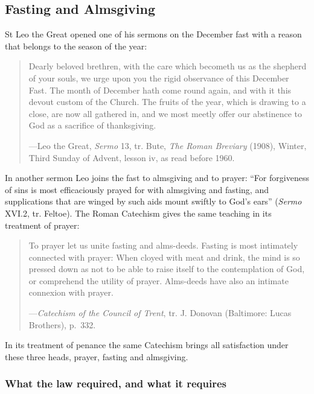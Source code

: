\subsection{Fasting and Almsgiving}\label{sec:fasting}

St Leo the Great opened one of his sermons on the December fast with a reason that belongs to the
season of the year:

\begin{quote}
Dearly beloved brethren, with the care which becometh us as the shepherd of your souls, we urge
upon you the rigid observance of this December Fast. The month of December hath come round again,
and with it this devout custom of the Church. The fruits of the year, which is drawing to a close,
are now all gathered in, and we most meetly offer our abstinence to God as a sacrifice of
thanksgiving.\par
{\smallskip\noindent\small ---Leo the Great, \textit{Sermo} 13, tr. Bute, \textit{The Roman
Breviary} (1908), Winter, Third Sunday of Advent, lesson iv, as read before 1960.\par}
\end{quote}

\noindent In another sermon Leo joins the fast to almsgiving and to prayer: ``For forgiveness
of sins is most efficaciously prayed for with almsgiving and fasting, and supplications that are
winged by such aids mount swiftly to God's ears'' (\textit{Sermo} XVI.2, tr. Feltoe). The Roman
Catechism gives the same teaching in its treatment of prayer:

\begin{quote}
To prayer let us unite fasting and alms-deeds. Fasting is most intimately connected with prayer:
When cloyed with meat and drink, the mind is so pressed down as not to be able to raise itself to
the contemplation of God, or comprehend the utility of prayer. Alms-deeds have also an intimate
connexion with prayer.\par
{\smallskip\noindent\small ---\textit{Catechism of the Council of Trent}, tr. J. Donovan
(Baltimore: Lucas Brothers), p.~332.\par}
\end{quote}

\noindent In its treatment of penance the same Catechism brings all satisfaction under these three
heads, prayer, fasting and almsgiving.

\subsubsection{What the law required, and what it requires}


